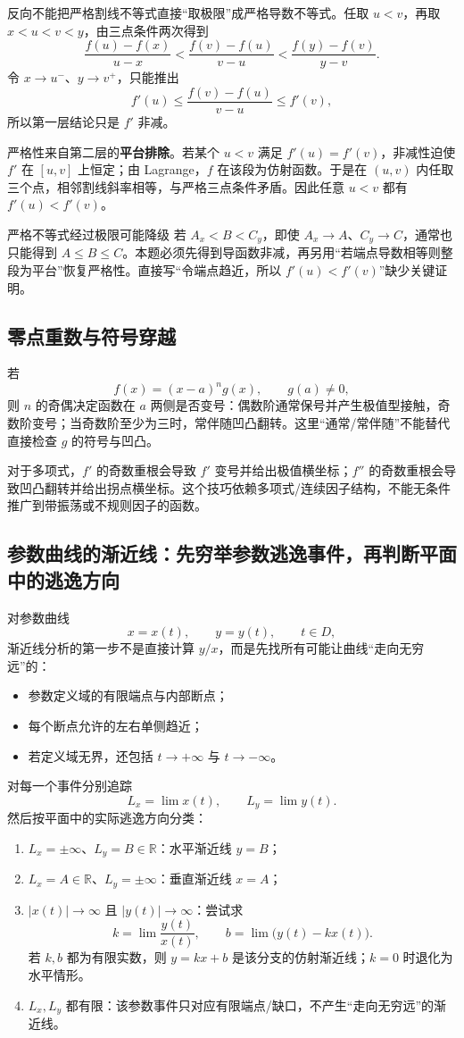 \documentclass[UTF8,fontset=none,11pt,a4paper]{ctexart}
\begin{document}
反向不能把严格割线不等式直接``取极限''成严格导数不等式。任取 $u<v$，再取
$x<u<v<y$，由三点条件两次得到
\[
\frac{f(u)-f(x)}{u-x}
<
\frac{f(v)-f(u)}{v-u}
<
\frac{f(y)-f(v)}{y-v}.
\]
令 $x\to u^-$、$y\to v^+$，只能推出
\[
f'(u)\le
\frac{f(v)-f(u)}{v-u}
\le f'(v),
\]
所以第一层结论只是 $f'$ 非减。

严格性来自第二层的\textbf{平台排除}。若某个 $u<v$ 满足 $f'(u)=f'(v)$，非减性迫使
$f'$ 在 $[u,v]$ 上恒定；由 Lagrange，$f$ 在该段为仿射函数。于是在 $(u,v)$ 内任取三个点，相邻割线斜率相等，与严格三点条件矛盾。因此任意 $u<v$ 都有 $f'(u)<f'(v)$。

\begin{warnbox}{严格不等式经过极限可能降级}
若 $A_x<B<C_y$，即使 $A_x\to A$、$C_y\to C$，通常也只能得到 $A\le B\le C$。本题必须先得到导函数非减，再另用``若端点导数相等则整段为平台''恢复严格性。直接写``令端点趋近，所以 $f'(u)<f'(v)$''缺少关键证明。
\end{warnbox}

\subsection{零点重数与符号穿越}

若
\[
f(x)={(x-a)}^n g(x),
\qquad g(a)\ne0,
\]
则 $n$ 的奇偶决定函数在 $a$ 两侧是否变号：偶数阶通常保号并产生极值型接触，奇数阶变号；当奇数阶至少为三时，常伴随凹凸翻转。这里“通常/常伴随”不能替代直接检查 $g$ 的符号与凹凸。

对于多项式，$f'$ 的奇数重根会导致 $f'$ 变号并给出极值横坐标；$f''$ 的奇数重根会导致凹凸翻转并给出拐点横坐标。这个技巧依赖多项式/连续因子结构，不能无条件推广到带振荡或不规则因子的函数。

\subsection{参数曲线的渐近线：先穷举参数逃逸事件，再判断平面中的逃逸方向}

对参数曲线
\[
x=x(t),\qquad y=y(t),\qquad t\in D,
\]
渐近线分析的第一步不是直接计算 $y/x$，而是先找所有可能让曲线“走向无穷远”的：
\begin{itemize}
  \item 参数定义域的有限端点与内部断点；
  \item 每个断点允许的左右单侧趋近；
  \item 若定义域无界，还包括 $t\to+\infty$ 与 $t\to-\infty$。
\end{itemize}
对每一个事件分别追踪
\[
L_x=\lim x(t),\qquad L_y=\lim y(t).
\]
然后按平面中的实际逃逸方向分类：
\begin{enumerate}
  \item $L_x=\pm\infty$、$L_y=B\in\mathbb R$：水平渐近线 $y=B$；
  \item $L_x=A\in\mathbb R$、$L_y=\pm\infty$：垂直渐近线 $x=A$；
  \item $\lvert x(t)\rvert\to\infty$ 且 $\lvert y(t)\rvert\to\infty$：尝试求
  \[
  k=\lim\frac{y(t)}{x(t)},\qquad
  b=\lim\bigl(y(t)-kx(t)\bigr).
  \]
  若 $k,b$ 都为有限实数，则 $y=kx+b$ 是该分支的仿射渐近线；$k=0$ 时退化为水平情形。
  \item $L_x,L_y$ 都有限：该参数事件只对应有限端点/缺口，不产生“走向无穷远”的渐近线。
\end{enumerate}
\end{document}
